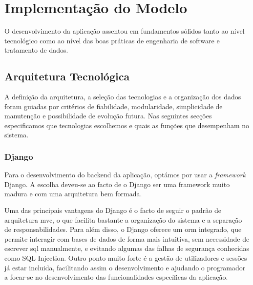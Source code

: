 



\chapter{Implementação do Modelo}
\label{ch:implementacaoDoModelo}

O desenvolvimento da aplicação assentou em fundamentos sólidos tanto ao nível tecnológico como ao nível das boas práticas de engenharia de software e tratamento de dados. 

\section{Arquitetura Tecnológica}
\label{sec:tec}

A definição da arquitetura, a seleção das tecnologias e a organização dos dados foram guiadas por critérios de fiabilidade, modularidade, simplicidade de manutenção e possibilidade de evolução futura.  Nas seguintes secções especificamos que tecnologias escolhemos e quais as funções que desempenham no sistema.

\subsection{Django}

Para o desenvolvimento do backend da aplicação, optámos por usar a \textit{framework} Django. A escolha deveu-se ao facto  de o Django ser uma framework muito madura e com uma arquitetura bem formada.

Uma das principais vantagens do Django é o facto de seguir o padrão de arquitetura \gls{mvc}, o que facilita bastante a organização do sistema e a separação de responsabilidades. Para além disso, o Django oferece um \gls{orm} integrado, que permite interagir com bases de dados de forma mais intuitiva, sem necessidade de escrever \gls{sql} manualmente, e evitando algumas das falhas de segurança conhecidas como SQL Injection. Outro ponto muito forte é a gestão de utilizadores e sessões já estar incluida, facilitando assim o desenvolvimento e ajudando o programador a focar-se no desenvolvimento das funcionalidades específicas da aplicação.

